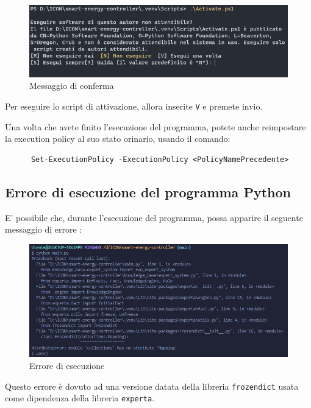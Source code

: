 \documentclass[12pt, letterpaper]{article}
\begin{document}
\begin{figure}[h]
      \centering
      \includegraphics[scale=0.6]{terminal-message.png}
      \caption{Messaggio di conferma}
\end{figure}

Per eseguire lo script di attivazione, allora inserite \texttt{V} e
premete invio. \\ \break

\noindent Una volta che avete finito l'esecuzione del programma, potete anche reimpostare
la execution policy al suo stato orinario, usando il comando:

\begin{verbatim}
      Set-ExecutionPolicy -ExecutionPolicy <PolicyNamePrecedente>
\end{verbatim}

\subsection{Errore di esecuzione del programma Python}
\label{sec:python-error}

E' possibile che, durante l'esecuzione del programma, possa apparire il seguente
messaggio di errore \cite{python-mapping-problem}: \\ \pagebreak

\begin{figure}[h]
      \centering
      \includegraphics[scale=0.55]{errore-python.png}
      \caption{Errore di esecuzione}
\end{figure}

\noindent Questo errore è dovuto ad una versione datata della libreria \texttt{frozendict}
usata come dipendenza della libreria \texttt{experta}. \\
\end{document}
